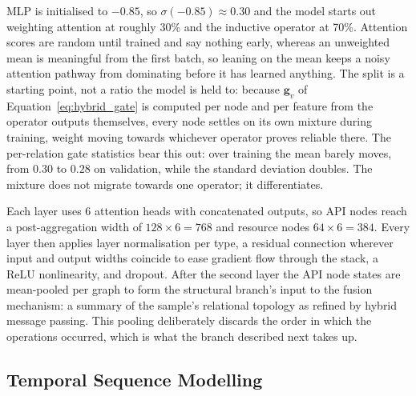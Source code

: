 \documentclass[%
    BCOR=10mm,
    DIV=13,
    toc=bibliography,
    toc=listof,
    oneside,
    12pt,
]{scrbook}
\begin{document}
MLP is initialised to $-0.85$, so $\sigma(-0.85) \approx 0.30$ and the model
starts out weighting attention at roughly 30\% and the inductive operator at
70\%. Attention scores are random until trained and say nothing early, whereas
an unweighted mean is meaningful from the first batch, so leaning on the mean
keeps a noisy attention pathway from dominating before it has learned
anything. The split is a starting point, not a ratio the model is held to:
because $\mathbf{g}_v$ of Equation~\ref{eq:hybrid_gate} is computed per node
and per feature from the operator outputs themselves, every node settles on
its own mixture during training, weight moving towards whichever operator
proves reliable there. The per-relation gate statistics bear this out: over
training the mean barely moves, from $0.30$ to $0.28$ on validation, while the
standard deviation doubles. The mixture does not migrate towards one operator;
it differentiates.

Each layer uses 6 attention heads with concatenated outputs, so API nodes
reach a post-aggregation width of $128 \times 6 = 768$ and resource nodes
$64 \times 6 = 384$. Every layer then applies layer normalisation per type, a
residual connection wherever input and output widths coincide to ease gradient
flow through the stack, a ReLU nonlinearity, and dropout. After the second
layer the API node states are mean-pooled per graph to form the structural
branch's input to the fusion mechanism: a summary of the sample's relational
topology as refined by hybrid message passing. This pooling deliberately discards the
order in which the operations occurred, which is what the branch described
next takes up.

\subsection{Temporal Sequence Modelling}
\label{subsec:temporal_branch}
\end{document}
